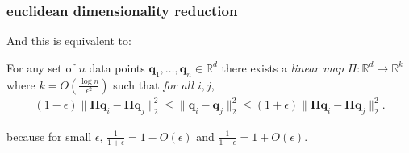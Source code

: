 \documentclass[compress]{beamer}
\newcommand{\bs}[1]{\boldsymbol{#1}}
\newcommand{\bv}[1]{\mathbf{#1}}
\newcommand{\R}{\mathbb{R}}
\begin{document}
\begin{frame}
	\frametitle{euclidean dimensionality reduction}
	And this is equivalent to:
	\begin{lemma}
		For any set of $n$ data points $\bv{q}_1,\ldots, \bv{q}_n \in \R^d$ there exists a \emph{linear map} $\Pi: \R^d \rightarrow \R^k$ where $k = O\left(\frac{\log n}{\epsilon^2}\right)$ such that \emph{for all $i,j$},
		\begin{align*}
			(1-\epsilon)\|\bs{\Pi}\bv{q}_i - \bs{\Pi}\bv{q}_j\|_2^{{{2}}} \leq \|\bv{q}_i - \bv{q}_j\|_2^{{{2}}} \leq (1+\epsilon)\|\bs{\Pi}\bv{q}_i - \bs{\Pi}\bv{q}_j\|_2^{{{2}}}.
		\end{align*}
	\end{lemma}
	because for small $\epsilon$, $\frac{1}{1+\epsilon} = 1 - O(\epsilon)$ and $\frac{1}{1-\epsilon} = 1 + O(\epsilon)$.
\end{frame}
\end{document}

